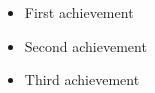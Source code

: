             \begin{itemize}
                \item First achievement
                \item Second achievement
                \item Third achievement
            \end{itemize}
            \divider